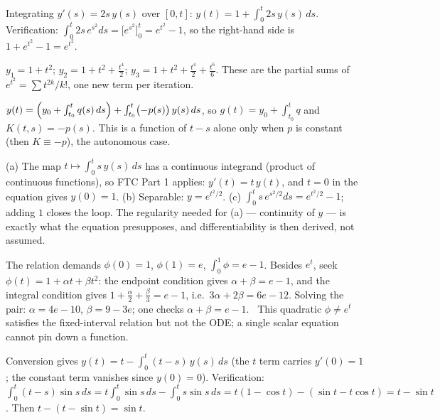\documentclass{essay}
\begin{document}
\begin{description}[leftmargin=0pt, itemsep=6pt]

\item[\ref{ex:basic}.] Integrating $y'(s) = 2s\,y(s)$ over $[0,t]$: $y(t) = 1 + \int_0^t 2s\,y(s)\,ds$. Verification: $\int_0^t 2s\,e^{s^2} ds = \bigl[e^{s^2}\bigr]_0^t = e^{t^2} - 1$, so the right-hand side is $1 + e^{t^2} - 1 = e^{t^2}$. \checkmark

\item[\ref{ex:picard}.] $y_1 = 1 + t^2$; $y_2 = 1 + t^2 + \tfrac{t^4}{2}$; $y_3 = 1 + t^2 + \tfrac{t^4}{2} + \tfrac{t^6}{6}$. These are the partial sums of $e^{t^2} = \sum t^{2k}/k!$, one new term per iteration.

\item[\ref{ex:linear}.] $y(t) = \Bigl(y_0 + \int_{t_0}^t q(s)\,ds\Bigr) + \int_{t_0}^t \bigl(-p(s)\bigr)\, y(s)\, ds$, so $g(t) = y_0 + \int_{t_0}^t q$ and $K(t,s) = -p(s)$. This is a function of $t - s$ alone only when $p$ is constant (then $K \equiv -p$), the autonomous case.

\item[\ref{ex:backward}.] (a) The map $t \mapsto \int_0^t s\,y(s)\,ds$ has a continuous integrand (product of continuous functions), so FTC Part 1 applies: $y' (t)= t\,y(t)$, and $t=0$ in the equation gives $y(0) = 1$. (b) Separable: $y = e^{t^2/2}$. (c) $\int_0^t s\,e^{s^2/2} ds = e^{t^2/2} - 1$; adding $1$ closes the loop. The regularity needed for (a) --- continuity of $y$ --- is exactly what the equation presupposes, and differentiability is then derived, not assumed.

\item[\ref{ex:wrongway}.] The relation demands $\phi(0) = 1$, $\phi(1) = e$, $\int_0^1 \phi = e-1$. Besides $e^t$, seek $\phi(t) = 1 + \alpha t + \beta t^2$: the endpoint condition gives $\alpha + \beta = e - 1$, and the integral condition gives $1 + \tfrac{\alpha}{2} + \tfrac{\beta}{3} = e - 1$, i.e.\ $3\alpha + 2\beta = 6e - 12$. Solving the pair: $\alpha = 4e - 10$, $\beta = 9 - 3e$; one checks $\alpha + \beta = e - 1$. \checkmark\ This quadratic $\phi \ne e^t$ satisfies the fixed-interval relation but not the ODE; a single scalar equation cannot pin down a function.

\item[\ref{ex:sine}.] Conversion gives $y(t) = t - \int_0^t (t - s)\,y(s)\,ds$ (the $t$ term carries $y'(0) = 1$; the constant term vanishes since $y(0)=0$). Verification: $\int_0^t (t-s)\sin s\,ds = t\int_0^t \sin s\, ds - \int_0^t s \sin s\, ds = t(1 - \cos t) - (\sin t - t\cos t) = t - \sin t$. Then $t - (t - \sin t) = \sin t$. \checkmark


\end{description}
\end{document}
